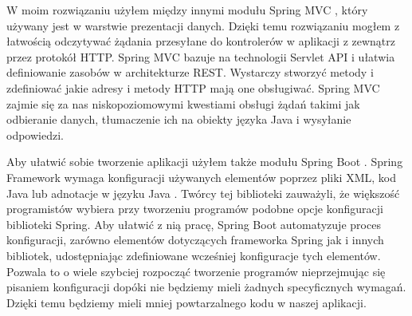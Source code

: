 \documentclass[shortabstract,inz]{iithesis}
\begin{document}
W moim rozwiązaniu użyłem między innymi modułu Spring MVC \cite{spring-mvc}, który używany jest w warstwie prezentacji danych. Dzięki temu rozwiązaniu mogłem z łatwością odczytywać żądania przesyłane do kontrolerów w aplikacji z zewnątrz przez protokół HTTP. Spring MVC bazuje na technologii Servlet API i ułatwia definiowanie zasobów w architekturze REST. Wystarczy stworzyć metody i zdefiniować jakie adresy i metody HTTP mają one obsługiwać. Spring MVC zajmie się za nas niskopoziomowymi kwestiami obsługi żądań takimi jak odbieranie danych, tłumaczenie ich na obiekty języka Java i wysyłanie odpowiedzi.

Aby ułatwić sobie tworzenie aplikacji użyłem także modułu Spring Boot \cite{spring-boot}. Spring Framework wymaga konfiguracji używanych elementów poprzez pliki XML, kod Java lub adnotacje w języku Java \citep{java-annotations}. Twórcy tej biblioteki zauważyli, że większość programistów wybiera przy tworzeniu programów podobne opcje konfiguracji biblioteki Spring. Aby ułatwić z nią pracę, Spring Boot automatyzuje proces konfiguracji, zarówno elementów dotyczących frameworka Spring jak i innych bibliotek, udostępniając zdefiniowane wcześniej konfiguracje tych elementów. Pozwala to o wiele szybciej rozpocząć tworzenie programów nieprzejmując się pisaniem konfiguracji dopóki nie będziemy mieli żadnych specyficznych wymagań. Dzięki temu będziemy mieli mniej powtarzalnego kodu w naszej aplikacji.
\end{document}
